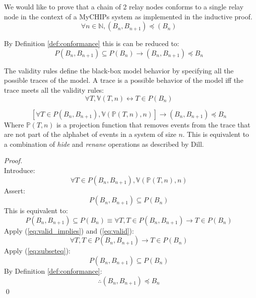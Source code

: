 \documentclass[runningheads]{llncs}
\newcommand{\actsvalid}[2]{\mathds{V}(#1, #2)}
\newcommand{\projectsize}[2]{\mathds{P}(#1, #2)}
\begin{document}
We would like to prove that a chain of 2 relay nodes conforms to a single relay node in the context of a MyCHIPs system as implemented in the inductive proof.
$$\forall n \in \mathds{N}, (B_n, B_{n+1}) \preceq (B_n)
$$

By Definition \ref{def:conformance} this is can be reduced to:
$$P(B_n, B_{n+1}) \subseteq P(B_n) \longrightarrow (B_n, B_{n+1}) \preceq B_n$$

The validity rules define the black-box model behavior by specifying all the possible traces of the model. A trace is a possible behavior of the model iff the trace meets all the validity rules:
\begin{equation}
\label{eq:valid_implies}
\forall T, \actsvalid{T}{n} \leftrightarrow
 T \in P(B_n)
\end{equation}

\begin{theorem}
\label{thm:valid_imp_conf}
$$
\left[ \forall T \in P(B_n, B_{n+1}), \actsvalid{\projectsize{T}{n}}{n} \right] \longrightarrow (B_n, B_{n+1}) \preceq B_n
$$
Where $\projectsize{T}{n}$ is a projection function that removes events from the trace that are not part of the alphabet of events in a system of size $n$. This is equivalent to a combination of \emph{hide} and \emph{renane} operations as described by Dill. 
\begin{proof}\ \\
Introduce: 
\begin{equation}
\label{eq:valid}
\forall T \in P(B_n, B_{n+1}), \actsvalid{\projectsize{T}{n}}{n}
\end{equation}
Assert:
\begin{equation}
P(B_n, B_{n+1}) \subseteq P(B_n)
\end{equation}
This is equivalent to:
\begin{equation}
\label{eq:subseteq}
P(B_n, B_{n+1}) \subseteq P(B_n) \equiv \forall T, T \in P(B_n, B_{n+1}) \longrightarrow T \in P(B_n)
\end{equation}
Apply (\ref{eq:valid_implies}) and (\ref{eq:valid}):
\begin{equation}
\forall T, T \in P(B_n, B_{n+1}) \longrightarrow T \in P(B_n)
\end{equation}
Apply (\ref{eq:subseteq}):
\begin{equation}
    \label{eq:goal2}
    P(B_n, B_{n+1}) \subseteq P(B_n)
\end{equation}
By Definition \ref{def:conformance}:
\begin{equation}
\therefore (B_n, B_{n+1}) \preceq B_n
\end{equation}
\qed
\end{proof}
\end{theorem}
\end{document}
